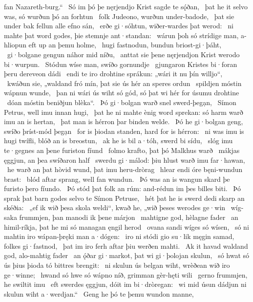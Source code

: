 fan Nazareth-burg.“ \hld\ Só im þó þe nęrjendjo Krist
sagde te sǫ́ðan, \hld\ þat he it selvo was,
só wurðun þó an forhtun \hld\ folk Judeono,
wurðun under-badode, \hld\ þat sie under bak fellun
alle efno sán, \hld\ erðe gi·sóhtun,
wiðer-wardes þat werod: \hld\ ni mahte þat word godes,
þie stemnje ant·standan: \hld\ wárun þoh só strídige man,
a-hliopun eft up an þemu holme, \hld\ hugi fastnodun,
bundun briost-gi·þáht, \hld\ gi·bolgane gengun
náhor mid níðu, \hld\ anttat sie þene nęrjendjon Krist
werodo bi·wurpun. \hld\ Stódun wíse man,
swíðo gornundje \hld\ gjungaron Kristes
bi·foran þeru dereveon dádi \hld\ endi te iro drohtine sprákun:
„wári it nu þín willjo“, \hld\ kwáðun sie, „waldand fró mín,
þat sie ús hér an speres ordun \hld\ spildjen móstin
wápnun wunde, \hld\ þan ni wári ús wiht só gód,
só þat wi hér for úsumu drohtine \hld\ dóan móstin
beniðjun blèka“. \hld\ Þó gi·bolgan warð
snel swerd-þegạn, \hld\ Símon Petrus,
well imu innan hugi, \hld\ þat he ni mahte ènig word sprekan:
só harm warð imu an is hertan, \hld\ þat man is hérron þar
binden welde. \hld\ Þó he gi·bolgan geng,
swíðo þríst-mód þegạn \hld\ for is þiodan standen,
hard for is hérron: \hld\ ni was imu is hugi twífli,
blóð an is breostun, \hld\ ak he is bil a·tóh,
swerd bi sídu, \hld\ slóg imu te·gegnes
an þene furiston fíund \hld\ folmo krafto,
þat þó Malkhus warð \hld\ mákjas ęggjun,
an þea swíðaron half \hld\ swerdu gi·málod:
þiu hlust warð imu far·hawan, \hld\ he warð an þat hòvid wund,
þat imu heru-dròrag \hld\ hlear endi óre
bęni-wundun brast: \hld\ blód aftar sprang,
well fan wundun. \hld\ Þó was an is wangun skard
þe furisto þero fíundo. \hld\ Þó stód þat folk an rúm:
and-rédun im þes billes biti. \hld\ Þó sprak þat barn godes
selvo te Símon Petruse, \hld\ hét þat he is swerd dedi
skarp an skéðia: \hld\ „ef ik wið þesa skola weldi“, kwað he,
„wið þeses werodes ge·win \hld\ wíg-saka frummjen,
þan manodi ik þene márjon \hld\ mahtigne god,
hèlagne fader \hld\ an himil-ríkja,
þat he mi só managan ęngil herod \hld\ ovana sandi
wíges só wísen, \hld\ só ni mahtin iro wápan-þręki
man a·dógen: \hld\ iro ni stódi gio su·lik męgin samad,
folkes gi·fastnod, \hld\ þat im iro ferh aftar þiu
werðen mahti. \hld\ Ak it havad waldand god,
alo-mahtig fader \hld\ an ǫ́ðar gi·markot,
þat wi gi·þolojan skulun, \hld\ só hwat só ús þius þioda tó
bittres brengit: \hld\ ni skulun ús belgan wiht,
wrèðean wið iro ge·winne; \hld\ hwand só hwe só wápno níð,
grimman gèr-hęti wili \hld\ gerno frummjen,
he swiltit imu \hld\ eft swerdes ęggjun,
dóit im bi·dròregan: \hld\ wi mid úsun dádjun ni skulun
wiht a·werdjan.“ \hld\ Geng he þó te þemu wundon manne,
